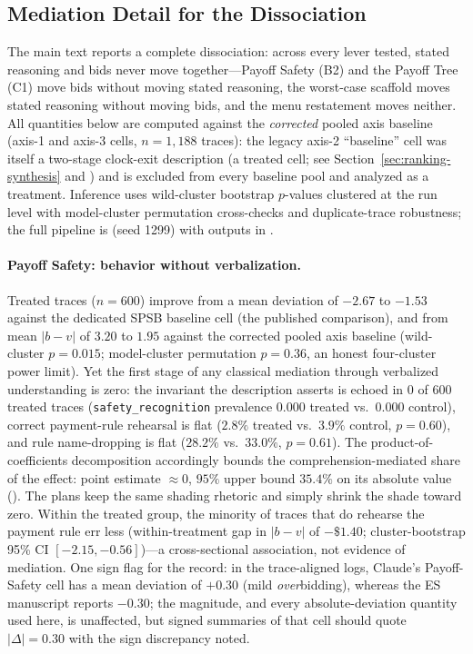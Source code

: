 \subsection{Mediation Detail for the Dissociation}\label{app:traces-mediation}

The main text reports a complete dissociation: across every lever tested, stated reasoning and bids never move together---Payoff Safety (B2) and the Payoff Tree (C1) move bids without moving stated reasoning, the worst-case scaffold moves stated reasoning without moving bids, and the menu restatement moves neither. All quantities below are computed against the \emph{corrected} pooled axis baseline (axis-1 and axis-3 cells, $n = 1{,}188$ traces): the legacy axis-2 ``baseline'' cell was itself a two-stage clock-exit description (a treated cell; see Section~\ref{sec:ranking-synthesis} and ) and is excluded from every baseline pool and analyzed as a treatment. Inference uses wild-cluster bootstrap $p$-values clustered at the run level with model-cluster permutation cross-checks and duplicate-trace robustness; the full pipeline is  (seed 1299) with outputs in .

\paragraph{Payoff Safety: behavior without verbalization.} Treated traces ($n = 600$) improve from a mean deviation of $-2.67$ to $-1.53$ against the dedicated SPSB baseline cell (the published comparison), and from mean $|b-v|$ of $3.20$ to $1.95$ against the corrected pooled axis baseline (wild-cluster $p = 0.015$; model-cluster permutation $p = 0.36$, an honest four-cluster power limit). Yet the first stage of any classical mediation through verbalized understanding is zero: the invariant the description asserts is echoed in 0 of 600 treated traces (\texttt{safety\_recognition} prevalence $0.000$ treated vs.\ $0.000$ control), correct payment-rule rehearsal is flat ($2.8\%$ treated vs.\ $3.9\%$ control, $p = 0.60$), and rule name-dropping is flat ($28.2\%$ vs.\ $33.0\%$, $p = 0.61$). The product-of-coefficients decomposition accordingly bounds the comprehension-mediated share of the effect: point estimate $\approx 0$, $95\%$ upper bound $35.4\%$ on its absolute value (). The plans keep the same shading rhetoric and simply shrink the shade toward zero. Within the treated group, the minority of traces that do rehearse the payment rule err less (within-treatment gap in $|b-v|$ of $-\$1.40$; cluster-bootstrap 95\% CI $[-2.15, -0.56]$)---a cross-sectional association, not evidence of mediation. One sign flag for the record: in the trace-aligned logs, Claude's Payoff-Safety cell has a mean deviation of $+0.30$ (mild \emph{over}bidding), whereas the ES manuscript reports $-0.30$; the magnitude, and every absolute-deviation quantity used here, is unaffected, but signed summaries of that cell should quote $|{\Delta}| = 0.30$ with the sign discrepancy noted.

